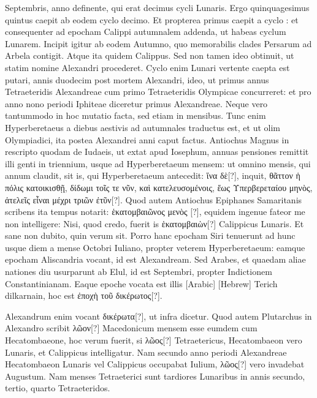  Septembris, anno  definente,
 qui erat decimus cycli Lunaris.
Ergo quinquagesimus quintus caepit ab eodem cyclo decimo.
Et propterea primus caepit a cyclo : et consequenter
  ad epocham
Calippi autumnalem addenda, ut habeas cyclum Lunarem.
Incipit igitur ab eodem Autumno, quo memorabilis clades Persarum
ad Arbela contigit.
Atque ita quidem Calippus.
Sed non tamen
ideo obtinuit, ut statim nomine Alexandri procederet.
Cyclo
enim Lunari vertente caepta est putari, annis duodecim post mortem
Alexandri, ideo, ut primus annus Tetraeteridis Alexandreae cum primo
Tetraeteridis Olympicae concurreret: et pro anno nono periodi
Iphiteae diceretur primus Alexandreae.
Neque vero tantummodo in
hoc mutatio facta, sed etiam in mensibus.
Tunc enim Hyperberetaeus
a diebus aestivis ad autumnales traductus est, et ut olim Olympiadici,
ita postea Alexandrei anni caput factus.
Antiochus Magnus in
rescripto quodam de Iudaeis, ut extat apud Iosephum, annuas pensiones
remittit illi genti in triennium, usque ad Hyperberetaeum mensem:
ut omnino mensis, qui annum claudit, sit is, qui Hyperberetaeum
antecedit: \textgreek{ἵνα δὲ[?]}, inquit,
 \textgreek{θᾶττον ἡ πόλις κατοικισθῇ, δίδωμι τοῖς τε
νῦν, καὶ κατελευσομένοις, ἕως Υπερβερεταίου μηνὸς,
 ἀτελεῖς εἶναι μέχρι τριῶν ἐτῦν[?]}.
Quod autem Antiochus Epiphanes Samaritanis scribens ita tempus
notarit: \textgreek{ἑκατομβαιῶνος μενὸς [?]},
 equidem ingenue fateor me non intelligere:
Nisi, quod credo, fuerit is \textgreek{ἑκατομβαιὼν[?]} Calippicus Lunaris.
%
Et sane non dubito, quin verum sit.
Porro hanc epocham Siri
tenuerunt ad hunc usque diem a mense Octobri Iuliano, propter veterem
Hyperberetaeum: eamque epocham Aliscandria vocant, id est
Alexandream.
Sed Arabes, et quaedam aliae nationes diu usurparunt
ab Elul, id est Septembri, propter Indictionem
Constantinianam.
Eaque epoche vocata
est illis \textarabic{}[Arabic] \texthebrew{}[Hebrew]
Terich dilkarnain, hoc est \textgreek{ἐποχὴ τοῦ δικέρωτος[?]}.
\begin{table}[htbp]
  
\end{table}
Alexandrum enim vocant \textgreek{δικέρωτα[?]}, ut infra
dicetur.
Quod autem Plutarchus in Alexandro
scribit \textgreek{λῶον[?]} Macedonicum mensem esse
eumdem cum Hecatombaeone, hoc verum
fuerit, si \textgreek{λῶος[?]} Tetraetericus, Hecatombaeon
vero Lunaris, et Calippicus intelligatur.
Nam
secundo anno periodi Alexandreae Hecatombaeon
Lunaris vel Calippicus occupabat Iulium, \textgreek{λῶος[?]} vero invadebat
Augustum.
Nam menses Tetraeterici sunt tardiores Lunaribus in
annis secundo, tertio, quarto Tetraeteridos.

